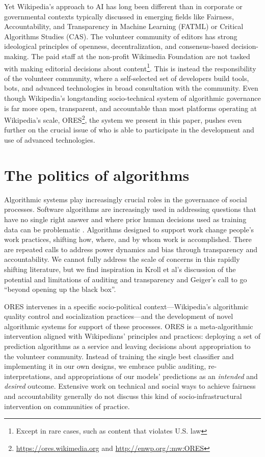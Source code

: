 \documentclass{sigchi-ext}
\begin{document}
Yet Wikipedia's approach to AI has long been different than in corporate or governmental contexts typically discussed in emerging fields like Fairness, Accountability, and Transparency in Machine Learning (FATML) or Critical Algorithms Studies (CAS). The volunteer community of editors has strong ideological principles of openness, decentralization, and consensus-based decision-making. The paid staff at the non-profit Wikimedia Foundation are not tasked with making editorial decisions about content\footnote{Except in rare cases, such as content that violates U.S. law}. This is instead the responsibility of the volunteer community, where a self-selected set of developers build tools, bots, and advanced technologies in broad consultation with the community. Even though Wikipedia's longstanding socio-technical system of algorithmic governance is far more open, transparent, and accountable than most platforms operating at Wikipedia's scale, ORES\footnote{\url{https://ores.wikimedia.org} and \url{http://enwp.org/:mw:ORES}}, the system we present in this paper, pushes even further on the crucial issue of who is able to participate in the development and use of advanced technologies.

\section{The politics of algorithms}
Algorithmic systems play increasingly crucial roles in the governance of social processes\cite{gillespie2014relevance}. Software algorithms are increasingly used in addressing questions that have no single right answer and where prior human decisions used as training data can be problematic \cite{barocas2013governing}. Algorithms designed to support work change people's work practices, shifting how, where, and by whom work is accomplished\cite{crawford2016algorithm, zuboff1988age}. There are repeated calls to address power dynamics and bias through transparency and accountability\cite{diakopoulos2017algorithmic,sandvig2014auditing}. We cannot fully address the scale of concerns in this rapidly shifting literature, but we find inspiration in Kroll et al's discussion of the potential and limitations of auditing and transparency \cite{kroll2016accountable} and Geiger's call to go ``beyond opening up the black box\cite{geiger2017beyond}''.

ORES intervenes in a specific socio-political context---Wikipedia's algorithmic quality control and socialization practices---and the development of novel algorithmic systems for support of these processes.  ORES is a meta-algorithmic intervention aligned with Wikipedians' principles and practices: deploying a set of prediction algorithms as a service and leaving decisions about appropriation to the volunteer community.  Instead of training the single best classifier and implementing it in our own designs, we embrace public auditing, re-interpretations, and appropriations of our models' predictions as an \emph{intended} and \emph{desired} outcome.  Extensive work on technical and social ways to achieve fairness and accountability generally do not discuss this kind of socio-infrastructural intervention on communities of practice.
\end{document}
